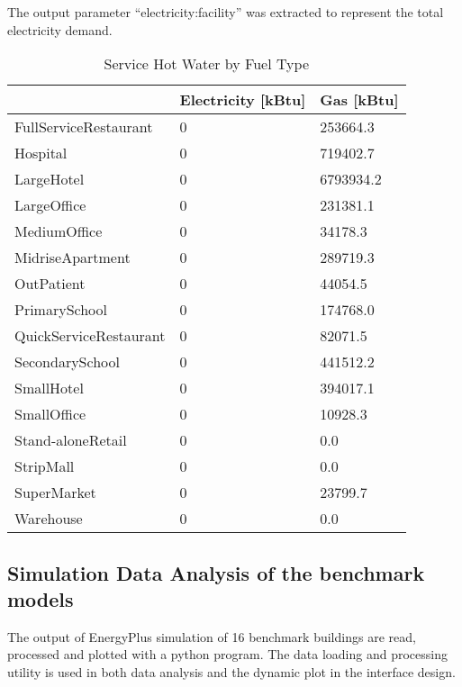 The output parameter ``electricity:facility'' was extracted to
represent the total electricity demand.

\begin{table}[h!]
\centering
\caption{Service Hot Water by Fuel Type}
\label{tab:hotWater}
\begin{tabular}{l|l|l}
  \hline
                       &  Electricity {[}kBtu{]} & Gas {[}kBtu{]} \\
  \hline
  \hline
FullServiceRestaurant  & 0 & 253664.3       \\
Hospital               & 0 & 719402.7       \\
LargeHotel             & 0 & 6793934.2      \\
LargeOffice            & 0 & 231381.1       \\
MediumOffice           & 0 & 34178.3        \\
MidriseApartment       & 0 & 289719.3       \\
OutPatient             & 0 & 44054.5        \\
PrimarySchool          & 0 & 174768.0       \\
QuickServiceRestaurant & 0 & 82071.5        \\
SecondarySchool        & 0 & 441512.2       \\
SmallHotel             & 0 & 394017.1       \\
SmallOffice            & 0 & 10928.3        \\
Stand-aloneRetail      & 0 & 0.0            \\
StripMall              & 0 & 0.0            \\
SuperMarket            & 0 & 23799.7        \\
Warehouse              & 0 & 0.0            \\
  \hline
\end{tabular}
\end{table}

\pagebreak
\subsection{Simulation Data Analysis of the benchmark
  models}\label{boxPlot}
The output of EnergyPlus simulation of 16 benchmark buildings are
read, processed and plotted with a python program. The data loading
and processing utility is used in both data analysis and the dynamic
plot in the interface design.

